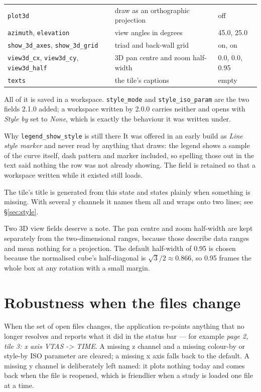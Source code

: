 \documentclass[11pt,a4paper,oneside]{report}
\newcommand{\code}[1]{\texttt{#1}}
\begin{document}
\begin{center}
\begin{longtable}{@{}p{}p{}p{}@{}}
\code{plot3d} & draw as an orthographic projection & off \\
\code{azimuth}, \code{elevation} & view angles in degrees & 45.0, 25.0 \\
\code{show\_3d\_axes}, \code{show\_3d\_grid} & triad and back-wall grid & on, on \\
\code{view3d\_cx}, \code{view3d\_cy}, \code{view3d\_half} & 3D pan centre and zoom half-width & 0.0, 0.0, 0.95 \\
\code{texts} & the tile's captions & empty \\
\bottomrule
\end{longtable}
\end{center}

All of it is saved in a workspace. \code{style\_mode} and
\code{style\_iso\_param} are the two fields 2.1.0 added; a workspace written by
2.0.0 carries neither and opens with \emph{Style by} set to \emph{None}, which is
exactly the behaviour it was written under.

\begin{aoenote}{Why \code{legend\_show\_style} is still there}
It was offered in an early build as \emph{Line style marker} and never read by
anything that draws: the legend shows a sample of the curve itself, dash pattern
and marker included, so spelling those out in the text said nothing the row was
not already showing. The field is retained so that a workspace written while it
existed still loads.
\end{aoenote}

The tile's title is generated from this state and states plainly when something
is missing. With several y channels it names them all and wraps onto two lines;
see \S\ref{sec:style}.

Two 3D view fields deserve a note. The pan centre and zoom half-width are kept
separately from the two-dimensional ranges, because those describe data ranges
and mean nothing for a projection. The default half-width of 0.95 is chosen
because the normalised cube's half-diagonal is $\sqrt{3}/2 \approx 0.866$, so
0.95 frames the whole box at any rotation with a small margin.

\section{Robustness when the files change}
\label{sec:swap}

When the set of open files changes, the application re-points anything that no
longer resolves and reports what it did in the status bar --- for example
\emph{page 2, tile 3: x axis VTAS -> TIME}. A missing z channel and a missing
colour-by or style-by ISO parameter are cleared; a missing x axis falls back to
the default. A missing y channel is deliberately left named: it plots nothing
today and comes back when the file is reopened, which is friendlier when a study
is loaded one file at a time.
\end{document}
